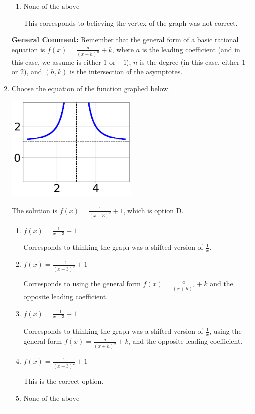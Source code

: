 \documentclass{extbook}[14pt]
\newcommand{\litem}[1]{\item #1

\rule{\textwidth}{0.4pt}}
\begin{document}
\begin{enumerate}
{\begin{enumerate}[label=\Alph*.]
Corresponds to thinking the graph was a shifted version of $\frac{1}{x^2}$.
\item \( \text{None of the above} \)

This corresponds to believing the vertex of the graph was not correct.
\end{enumerate}

\textbf{General Comment:} Remember that the general form of a basic rational equation is $ f(x) = \frac{a}{(x-h)^n} + k$, where $a$ is the leading coefficient (and in this case, we assume is either $1$ or $-1$), $n$ is the degree (in this case, either $1$ or $2$), and $(h, k)$ is the intersection of the asymptotes.
}
\litem{
Choose the equation of the function graphed below.

\begin{center}
    \includegraphics[width=0.5\textwidth]{../Figures/rationalGraphToEquationCopyB.png}
\end{center}


The solution is \( f(x) = \frac{1}{(x - 3)^2} + 1 \), which is option D.\begin{enumerate}[label=\Alph*.]
\item \( f(x) = \frac{1}{x - 3} + 1 \)

Corresponds to thinking the graph was a shifted version of $\frac{1}{x}$.
\item \( f(x) = \frac{-1}{(x + 3)^2} + 1 \)

Corresponds to using the general form $f(x) = \frac{a}{(x+h)^2}+k$ and the opposite leading coefficient.
\item \( f(x) = \frac{-1}{x + 3} + 1 \)

Corresponds to thinking the graph was a shifted version of $\frac{1}{x}$, using the general form $f(x) = \frac{a}{(x+h)^2}+k$, and the opposite leading coefficient.
\item \( f(x) = \frac{1}{(x - 3)^2} + 1 \)

This is the correct option.
\item \( \text{None of the above} \)


\end{enumerate}}
\end{enumerate}
\end{document}
